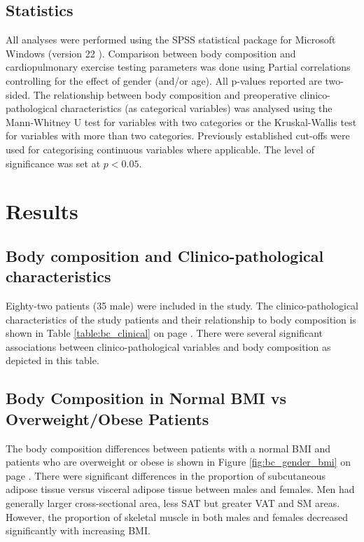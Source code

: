 \subsection{Statistics}

All analyses were performed using the SPSS statistical package for Microsoft Windows (version 22 ). Comparison between body composition and cardiopulmonary exercise testing parameters was done using Partial correlations controlling for the effect of gender (and/or age). All p-values reported are two-sided. The relationship between body composition and preoperative clinico-pathological characteristics (as categorical variables) was analysed using the Mann-Whitney U test for variables with two categories or the Kruskal-Wallis test for variables with more than two categories. Previously established cut-offs were used for categorising continuous variables where applicable. The level of significance was set at $p<0.05$.

\clearpage
\section{Results}

\subsection{Body composition and Clinico-pathological characteristics}
Eighty-two patients (35 male) were included in the study. The clinico-pathological characteristics of the study patients and their relationship to body composition is shown in Table \ref{table:bc_clinical} on page \pageref{table:bc_clinical}. There were several significant associations between clinico-pathological variables and body composition as depicted in this table.
	
	
	

\subsection{Body Composition in Normal BMI vs Overweight/Obese Patients}
The body composition differences between patients with a normal BMI and patients who are overweight or obese is shown in Figure \ref{fig:bc_gender_bmi} on page \pageref{fig:bc_gender_bmi}. There were significant differences in the proportion of subcutaneous adipose tissue versus visceral adipose tissue between males and females. Men had generally larger cross-sectional area, less SAT but greater VAT and SM areas. However, the proportion of skeletal muscle in both males and females decreased significantly with increasing BMI.

